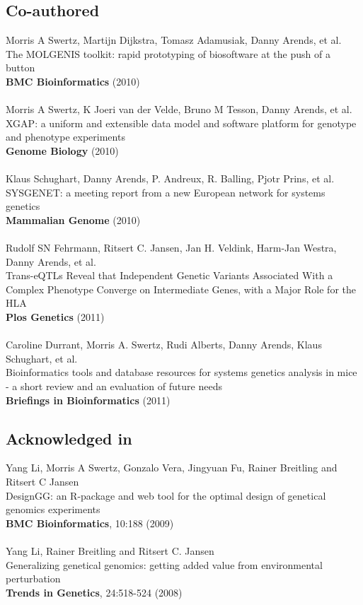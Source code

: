 \documentclass[10pt, oneside, a5paper]{report}
\newcommand{\authors}[1]{\small{#1}}
\newcommand{\bold}[1]{{\bfseries #1}}
\begin{document}
\subsection*{Co-authored}
  \authors{Morris A Swertz, Martijn Dijkstra, Tomasz Adamusiak, Danny Arends, et al.}\\
  The MOLGENIS toolkit: rapid prototyping of biosoftware at the push of a button\\
  \bold{BMC Bioinformatics} (2010)\\\\
  \authors{Morris A Swertz, K Joeri van der Velde, Bruno M Tesson, Danny Arends, et al.}\\
  XGAP: a uniform and extensible data model and software platform for genotype and phenotype experiments\\
  \bold{Genome Biology} (2010)\\\\
  \authors{Klaus Schughart, Danny Arends, P. Andreux, R. Balling, Pjotr Prins, et al.}\\
  SYSGENET: a meeting report from a new European network for systems genetics\\
  \bold{Mammalian Genome} (2010)\\\\
  \authors{Rudolf SN Fehrmann, Ritsert C. Jansen, Jan H. Veldink, Harm-Jan Westra, Danny Arends, et al.}\\
  Trans-eQTLs Reveal that Independent Genetic Variants Associated With a Complex Phenotype Converge on Intermediate Genes, with a Major Role for the HLA\\
  \bold{Plos Genetics} (2011)\\\\
  \authors{Caroline Durrant, Morris A. Swertz, Rudi Alberts, Danny Arends, Klaus Schughart, et al.}\\
  Bioinformatics tools and database resources for systems genetics analysis in mice - a short review and an evaluation of future needs\\
  \bold{Briefings in Bioinformatics} (2011)

\subsection*{Acknowledged in}
  \authors{Yang Li, Morris A Swertz, Gonzalo Vera, Jingyuan Fu, Rainer Breitling and Ritsert C Jansen}\\
  DesignGG: an R-package and web tool for the optimal design of genetical genomics experiments\\
  \bold{BMC Bioinformatics}, 10:188 (2009)\\\\
  \authors{Yang Li, Rainer Breitling and Ritsert C. Jansen}\\
  Generalizing genetical genomics: getting added value from environmental perturbation\\
  \bold{Trends in Genetics}, 24:518-524 (2008)



\end{document}
